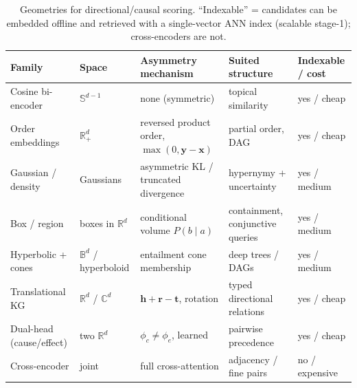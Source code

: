 \begin{table}[t]
\centering
\footnotesize
\caption{Geometries for directional/causal scoring. ``Indexable'' = candidates
can be embedded offline and retrieved with a single-vector ANN index (scalable
stage-1); cross-encoders are not.}
\label{tab:geometries}
\begin{tabular}{@{}llll l@{}}
\toprule
Family & Space & Asymmetry mechanism & Suited structure & Indexable / cost \\
\midrule
Cosine bi-encoder & $\mathbb{S}^{d-1}$ & none (symmetric) & topical similarity & yes / cheap \\
Order embeddings \citep{geo:vendrov2016order} & $\mathbb{R}^d_{+}$ & reversed product order, $\max(0,\mathbf{y}{-}\mathbf{x})$ & partial order, DAG & yes / cheap \\
Gaussian / density \citep{geo:vilnis2015gaussian,geo:athiwaratkun2018density} & Gaussians & asymmetric KL / truncated divergence & hypernymy + uncertainty & yes / medium \\
Box / region \citep{geo:vilnis2018box,geo:ren2020query2box} & boxes in $\mathbb{R}^d$ & conditional volume $P(b\mid a)$ & containment, conjunctive queries & yes / medium \\
Hyperbolic + cones \citep{geo:nickel2017poincare,geo:ganea2018cones} & $\mathbb{B}^d$ / hyperboloid & entailment cone membership & deep trees / DAGs & yes / medium \\
Translational KG \citep{geo:bordes2013transe,geo:sun2019rotate} & $\mathbb{R}^d$ / $\mathbb{C}^d$ & $\mathbf{h}{+}\mathbf{r}{-}\mathbf{t}$, rotation & typed directional relations & yes / cheap \\
Dual-head (cause/effect) & two $\mathbb{R}^d$ & $\phi_c\neq\phi_e$, learned & pairwise precedence & yes / cheap \\
Cross-encoder & joint & full cross-attention & adjacency / fine pairs & no / expensive \\
\bottomrule
\end{tabular}
\end{table}

